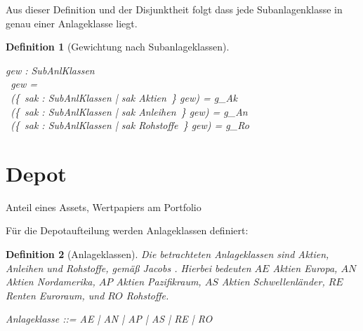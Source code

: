 \documentclass[12pt]{scrartcl}
\newtheorem{genericdef}{Generic Definition}[section]
\newtheorem{zdef}{Definition}[section]
\newcommand{\dsum}{\Sigma}
\begin{document}
Aus dieser Definition und der Disjunktheit folgt dass jede
Subanlagenklasse in genau einer Anlageklasse liegt.  

\begin{zdef}[Gewichtung nach Subanlageklassen]
  \label{zdef:gewichtung-subanlageklassen}
  \begin{axdef}
    gew : SubAnlKlassen \fun \rat \\
    \where
    \dsum~gew = \aone \\
    \dsum~(\{~sak : SubAnlKlassen | sak \subseteq Aktien~\} \dres gew)
    = g\_Ak \\
    \dsum~(\{~sak : SubAnlKlassen | sak \subseteq Anleihen~\} \dres gew)
    = g\_An \\
    \dsum~(\{~sak : SubAnlKlassen | sak \subseteq Rohstoffe~\} \dres gew)
    = g\_Ro \\
  \end{axdef}
\end{zdef}

\section{Depot}
\label{sec:depot}
Anteil eines Assets, Wertpapiers am Portfolio


Für die Depotaufteilung werden Anlageklassen definiert:

\begin{zdef}[Anlageklassen]
  \label{zdef:anlageklassen}
  Die betrachteten Anlageklassen sind Aktien, Anleihen und Rohstoffe,
  gemäß Jacobs \cite{Jacobs2016}. Hierbei bedeuten $AE$ Aktien Europa,
  $AN$ Aktien Nordamerika, $AP$ Aktien Pazifikraum, $AS$ Aktien
  Schwellenländer, $RE$ Renten Euroraum, und $RO$ Rohstoffe. 
  \begin{zed}
    Anlageklasse ::= AE | AN | AP | AS | RE | RO 
  \end{zed}
\end{zdef}


\end{document}
